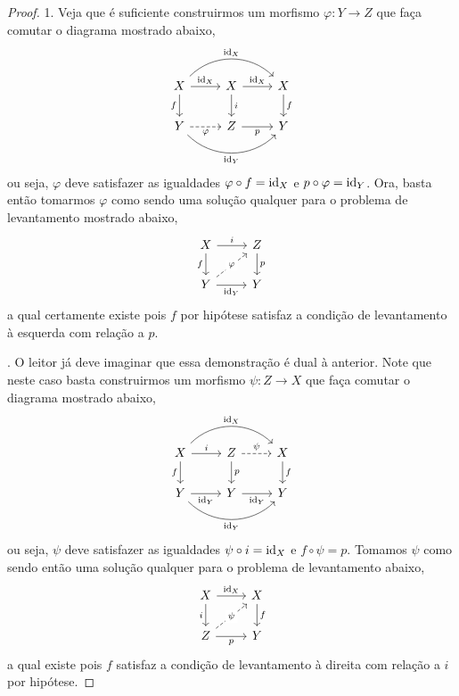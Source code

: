 \begin{proof}
  1. Veja que é suficiente construirmos um morfismo $\varphi: Y \to Z$ que faça comutar o diagrama mostrado abaixo,
  \begin{displaymath}
    \begin{tikzcd}
      X
      \arrow[r, "\id_X"]
      \arrow[rr, bend left=45, "\id_X"]
      \arrow[d, "f" swap]
      & X
      \arrow[r, "\id_X"]
      \arrow[d, "i"]
      & X
      \arrow[d, "f"]
      \\ Y
      \arrow[r, dashed, "\varphi" swap]
      \arrow[rr, bend right=45, "\id_Y" swap]
      & Z
      \arrow[r, "p" swap]
      & Y
    \end{tikzcd}
  \end{displaymath}
  ou seja, $\varphi$ deve satisfazer as igualdades $\varphi \circ f = \mathrm{id}_X$ e $p \circ \varphi = \mathrm{id}_Y$.
  Ora, basta então tomarmos $\varphi$ como sendo uma solução qualquer para o problema de levantamento mostrado abaixo,
  \begin{displaymath}
    \begin{tikzcd}
      X
      \arrow[r, "i"]
      \arrow[d, "f" swap]
      & Z
      \arrow[d, "p"]
      \\ Y
      \arrow[r, "\id_Y" swap]
      \arrow[ru, dashed, "\varphi" description]
      & Y
    \end{tikzcd}
  \end{displaymath}
  a qual certamente existe pois $f$ por hipótese satisfaz a condição de levantamento à esquerda com relação a $p$.

  . O leitor já deve imaginar que essa demonstração é dual à anterior.
  Note que neste caso basta construirmos um morfismo $\psi: Z \to X$ que faça comutar o diagrama mostrado abaixo,
  \begin{displaymath}
    \begin{tikzcd}
      X
      \arrow[r, "i"]
      \arrow[rr, bend left=45, "\id_X"]
      \arrow[d, "f" swap]
      & Z
      \arrow[r, dashed, "\psi"]
      \arrow[d, "p"]
      & X
      \arrow[d, "f"]
      \\ Y
      \arrow[r, "\id_Y" swap]
      \arrow[rr, bend right=45, "\id_Y" swap]
      & Y
      \arrow[r, "\id_Y" swap]
      & Y
    \end{tikzcd}
  \end{displaymath}
  ou seja, $\psi$ deve satisfazer as igualdades $\psi \circ i = \mathrm{id}_X$ e $f \circ \psi = p$.
  Tomamos $\psi$ como sendo então uma solução qualquer para o problema de levantamento abaixo,
  \begin{displaymath}
    \begin{tikzcd}
      X
      \arrow[r, "\id_X"]
      \arrow[d, "i" swap]
      & X
      \arrow[d, "f"]
      \\ Z
      \arrow[r, "p" swap]
      \arrow[ru, dashed, "\psi" description]
      & Y
    \end{tikzcd}
  \end{displaymath}
  a qual existe pois $f$ satisfaz a condição de levantamento à direita com relação a $i$ por hipótese.
\end{proof}


